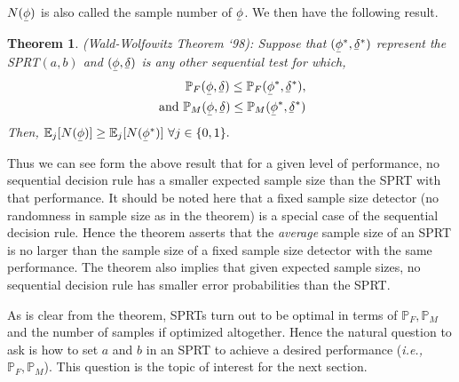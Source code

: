 \documentclass[a4paper,english,12pt]{article}
\newcommand{\ubar}[1]{\underaccent{\bar}{#1}}
\newtheorem{theorem}{Theorem}[section]
\begin{document}
$N(\ubar\phi)$ is also called the sample number of $\ubar\phi$. We then have the following result.
\begin{theorem}{(Wald-Wolfowitz Theorem `98):}
Suppose that $ (\ubar\phi^*,\ubar\delta^*) $ represent the SPRT$ (a,b) $ and $ (\ubar\phi,\ubar\delta) $ is any other sequential test for which,
\begin{eqnarray*}
\mathbb{P}_F(\ubar\phi,\ubar\delta)\leq \mathbb{P}_F(\ubar\phi^*,\ubar\delta^*), \\
\text{ and }\mathbb{P}_M(\ubar\phi,\ubar\delta) \leq \mathbb{P}_M(\ubar\phi^*,\ubar\delta^*)
\end{eqnarray*}
Then, $ \mathbb{E}_j[N(\ubar\phi)] \geq \mathbb{E}_j[N(\ubar\phi^*)] ~\forall j \in \{0,1\}. $
\end{theorem}
Thus we can see form the above result that for a given level of performance, no sequential decision rule has a smaller expected sample size than the SPRT with that performance. It should be noted here that a fixed sample size detector (no randomness in sample size as in the theorem) is a special case of the sequential decision rule. Hence the theorem asserts that the \textit{average} sample size of an SPRT is no larger than the sample size of a fixed sample size detector with the same performance. The theorem also implies that given expected sample sizes, no sequential decision rule has smaller error probabilities than the SPRT. 
\par As is clear from the theorem, SPRTs turn out to be optimal in terms of $\mathbb{P}_F, \mathbb{P}_M$ and the number of samples if optimized altogether. Hence the natural question to ask is how to set $a$ and $b$ in an SPRT to achieve a desired performance (\textit{i.e.,} $\mathbb{P}_F, \mathbb{P}_M$). This question is the topic of interest for the next section.
\end{document}
